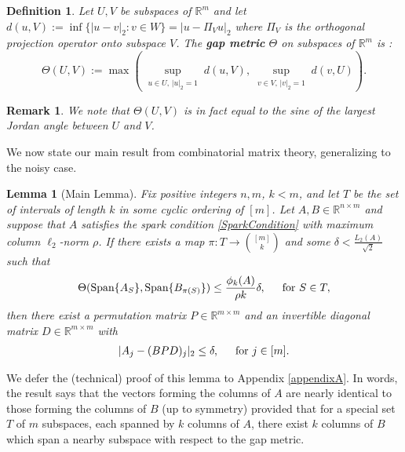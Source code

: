 \documentclass[journal, twocolumn]{IEEEtran}
\newtheorem{lemma}{Lemma}
\newtheorem{definition}{Definition}
\newtheorem{remark}{Remark}
\begin{document}
\begin{definition}\label{GapMetricDef}
Let $U, V$ be subspaces of $\mathbb{R}^m$ and let $d(u,V) := \inf\{|u-v|_2: v \in W\} = |u - \Pi_V u|_2$ where $\Pi_V$ is the orthogonal projection operator onto subspace $V$. The \textbf{gap metric} $\Theta$ on subspaces of $\mathbb{R}^{m}$ is \cite{Akhiezer13}:
\begin{equation}\label{SubspaceMetric}
\Theta(U,V) := \max\left( \sup_{\substack{u \in U, \, |u|_2 = 1}} d(u,V), \sup_{\substack{v \in V, \, |v|_2 = 1}} d(v,U) \right).
\end{equation}
\end{definition}

\begin{remark}
We note that $\Theta(U,V)$ is in fact equal to the sine of the largest Jordan angle between $U$ and $V$.
\end{remark}

We now state our main result from combinatorial matrix theory, generalizing \cite[Lemma 1]{Hillar15} to the noisy case.

\begin{lemma}[Main Lemma]\label{MainLemma}
Fix positive integers $n, m$, $k < m$, and let $T$ be the set of intervals of length $k$ in some cyclic ordering of $[m]$. Let $A, B \in \mathbb{R}^{n \times m}$ and suppose that $A$ satisfies the spark condition \eqref{SparkCondition} with maximum column $\ell_2$-norm $\rho$.  If there exists a map $\pi: T \to {[m] \choose k}$ and some $\delta < \frac{L_{2}(A)}{\sqrt{2}}$ such that 
\begin{equation}\label{GapUpperBound}
\Theta(\text{\rm Span}\{A_{S}\}, \text{\rm Span}\{B_{\pi(S)}\}) \leq \frac{ \phi_k(A) }{\rho k} \delta, \indent \text{for } S \in T,
\end{equation}
%
then there exist a permutation matrix $P \in \mathbb{R}^{m \times m}$ and an invertible diagonal matrix $D \in \mathbb{R}^{m \times m}$ with
\begin{align}
|A_j - (BPD)_j|_2 \leq \delta, \indent \text{for } j \in [m].
\end{align}
\end{lemma}
We defer the (technical) proof of this lemma to Appendix \ref{appendixA}. In words, the result says that the vectors forming the columns of $A$ are nearly identical to those forming the columns of $B$ (up to symmetry) provided that for a special set $T$ of $m$ subspaces, each spanned by $k$ columns of $A$, there exist $k$ columns of $B$ which span a nearby subspace with respect to the gap metric.
\end{document}
